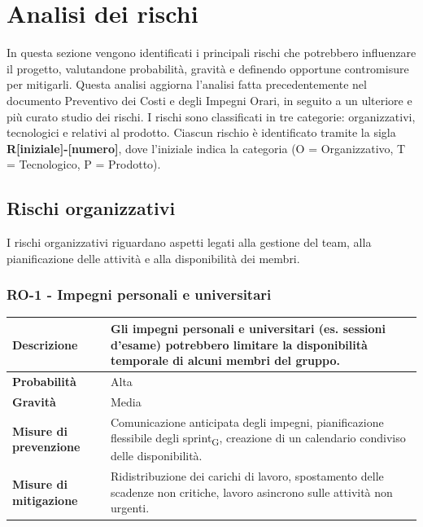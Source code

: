 \documentclass[11pt,a4paper]{article}
\newcommand{\gls}[1]{#1\textsubscript{G}}
\begin{document}
\newpage

\section{Analisi dei rischi}
In questa sezione vengono identificati i principali rischi che potrebbero influenzare il progetto, valutandone probabilità, gravità e definendo opportune contromisure per mitigarli. Questa analisi aggiorna l'analisi fatta precedentemente nel documento Preventivo dei Costi e degli Impegni Orari, in seguito a un ulteriore e più curato studio dei rischi.
I rischi sono classificati in tre categorie: organizzativi, tecnologici e relativi al prodotto. Ciascun rischio è identificato tramite la sigla \textbf{R[iniziale]-[numero]}, dove l'iniziale indica la categoria (O = Organizzativo, T = Tecnologico, P = Prodotto).

\subsection{Rischi organizzativi}
I rischi organizzativi riguardano aspetti legati alla gestione del team, alla pianificazione delle attività e alla disponibilità dei membri.

\subsubsection{RO-1 - Impegni personali e universitari}
\begin{center}
\begin{tabular}{|p{3cm}|p{12cm}|}
    \hline
    \textbf{Descrizione} & Gli impegni personali e universitari (es. sessioni d'esame) potrebbero limitare la disponibilità temporale di alcuni membri del gruppo. \\
    \hline
    \textbf{Probabilità} & Alta \\
    \hline
    \textbf{Gravità} & Media \\
    \hline
    \textbf{Misure di prevenzione} & Comunicazione anticipata degli impegni, pianificazione flessibile degli \gls{sprint}, creazione di un calendario condiviso delle disponibilità. \\
    \hline
    \textbf{Misure di mitigazione} & Ridistribuzione dei carichi di lavoro, spostamento delle scadenze non critiche, lavoro asincrono sulle attività non urgenti. \\
    \hline
\end{tabular}
\end{center}
\end{document}
